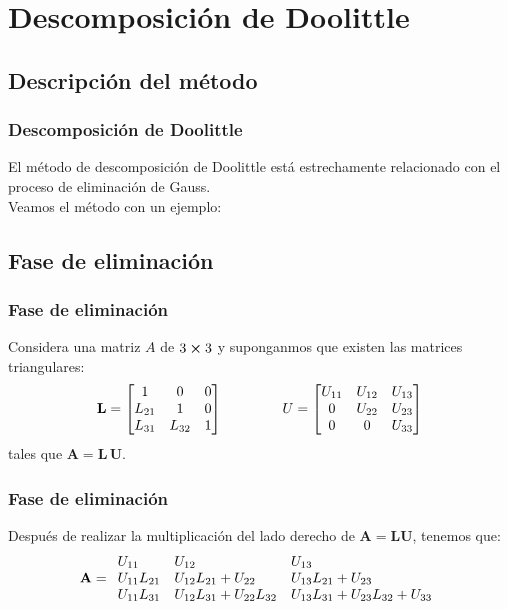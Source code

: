 \section{Descomposición de Doolittle}
\subsection{Descripción del método}
\begin{frame}
\frametitle{Descomposición de Doolittle}
El método de descomposición de Doolittle está estrechamente relacionado con el proceso de eliminación de Gauss.
\\
\bigskip
Veamos el método con un ejemplo:
\end{frame}
\subsection{Fase de eliminación}
\begin{frame}[fragile]
\frametitle{Fase de eliminación}
Considera una matriz $A$ de $3 \cp 3$ y suponganmos que existen las matrices triangulares:
\begin{align*}
\mathbf{L} =
\begin{bmatrix}
1 & 0 & 0 \\
L_{21} & 1 & 0 \\
L_{31} & L_{32} & 1
\end{bmatrix}
\hspace{1.5cm} U =
\begin{bmatrix}
U_{11} & U_{12} & U_{13} \\
0 & U_{22} & U_{23} \\
0 & 0 & U_{33}
\end{bmatrix}
\end{align*}
tales que $\mathbf{A = L \, U}$.
\end{frame}
\begin{frame}
\frametitle{Fase de eliminación}
Después de realizar la multiplicación del lado derecho de $\mathbf{A = LU}$, tenemos que:
\fontsize{12}{12}\selectfont
\begin{align*}
\mathbf{A} =
\begin{array}{l l l}
U_{11} & U_{12} & U_{13} \\
U_{11}L_{21} & U_{12}L_{21} + U_{22} & U_{13}L_{21} + U_{23} \\
U_{11}L_{31} & U_{12}L_{31} + U_{22}L_{32} & U_{13}L_{31} + U_{23}L_{32} + U_{33}
\end{array}
\end{align*}
\end{frame}
